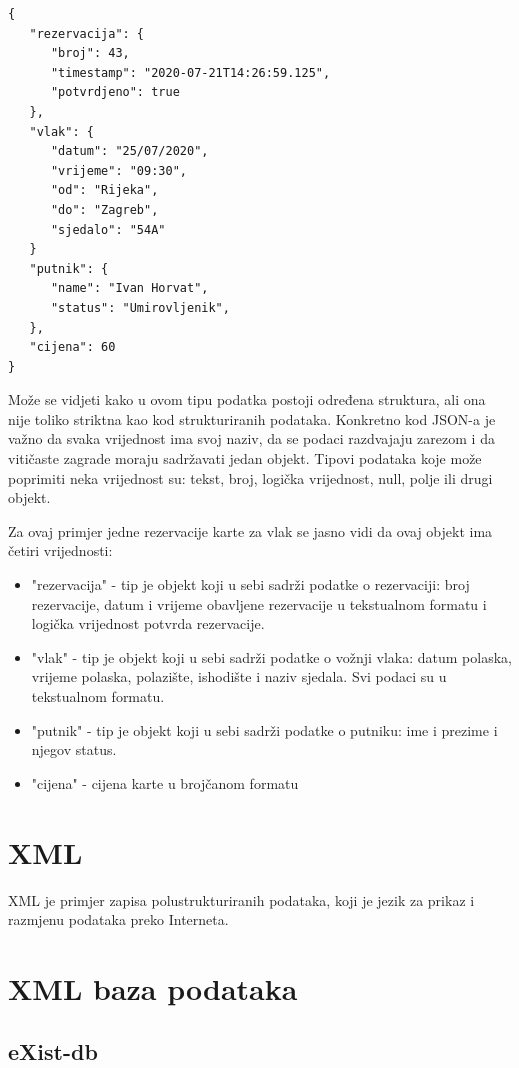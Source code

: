 \documentclass{foi}
\begin{document}
\begin{lstlisting}
{
   "rezervacija": {
      "broj": 43,
      "timestamp": "2020-07-21T14:26:59.125",
      "potvrdjeno": true
   },
   "vlak": {
      "datum": "25/07/2020",
      "vrijeme": "09:30",
      "od": "Rijeka",
      "do": "Zagreb",
      "sjedalo": "54A"
   }
   "putnik": {
      "name": "Ivan Horvat",
      "status": "Umirovljenik",
   },
   "cijena": 60
}
\end{lstlisting}

Može se vidjeti kako u ovom tipu podatka postoji određena struktura, ali ona nije toliko striktna kao kod strukturiranih podataka. Konkretno kod JSON-a je važno da svaka vrijednost ima svoj naziv, da se podaci razdvajaju zarezom i da vitičaste zagrade moraju sadržavati jedan objekt. Tipovi podataka koje može poprimiti neka vrijednost su: tekst, broj, logička vrijednost, null,  polje ili drugi objekt. 

Za ovaj primjer jedne rezervacije karte za vlak se jasno vidi da ovaj objekt ima četiri vrijednosti:

\begin{itemize}
\item "rezervacija" - tip je objekt koji u sebi sadrži podatke o rezervaciji: broj rezervacije, datum i vrijeme obavljene rezervacije u tekstualnom formatu i logička vrijednost potvrda rezervacije.
\item "vlak" - tip je objekt koji u sebi sadrži podatke o vožnji vlaka: datum polaska, vrijeme polaska, polazište, ishodište i naziv sjedala. Svi podaci su u tekstualnom formatu.
\item "putnik" - tip je objekt koji u sebi sadrži podatke o putniku: ime i prezime i njegov status.
\item "cijena" -  cijena karte u brojčanom formatu
\end{itemize}

\chapter{XML}

XML je primjer zapisa polustrukturiranih podataka, koji je jezik za prikaz i razmjenu podataka preko Interneta.

\chapter{XML baza podataka}

\lipsum[1]

\section{eXist-db}
\end{document}
